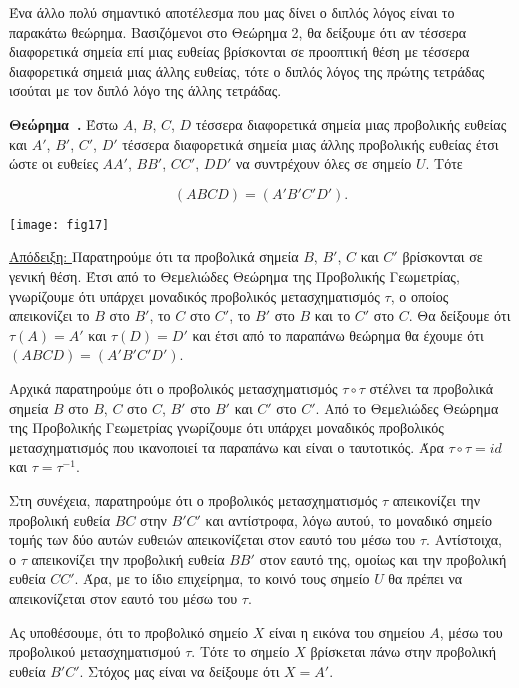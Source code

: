 \documentclass[12pt, a4paper]{book}
\newcounter{theorem}[section]
\newenvironment{theorem}[1][]{\refstepcounter{theorem}\par\medskip
   \textbf{Θεώρημα~\thetheorem. #1} \rmfamily}{\medskip}
\begin{document}
Ένα άλλο πολύ σημαντικό αποτέλεσμα που μας δίνει ο διπλός λόγος είναι το παρακάτω θεώρημα. Βασιζόμενοι στο Θεώρημα 2, θα δείξουμε ότι αν τέσσερα διαφορετικά σημεία επί μιας ευθείας βρίσκονται σε προοπτική θέση με τέσσερα διαφορετικά σημειά μιας άλλης ευθείας, τότε ο διπλός λόγος της πρώτης τετράδας ισούται με τον διπλό λόγο της άλλης τετράδας. 

\begin{theorem}
Έστω $A$, $B$, $C$, $D$ τέσσερα διαφορετικά σημεία μιας προβολικής ευθείας και $A'$, $B'$, $C'$, $D'$ τέσσερα διαφορετικά σημεία μιας άλλης προβολικής ευθείας έτσι ώστε οι ευθείες $AA'$, $BB'$, $CC'$, $DD'$ να συντρέχουν όλες σε σημείο $U$. Τότε

\begin{displaymath}
(ABCD)=(A'B'C'D').
\end{displaymath}
\end{theorem}

\begin{center}
\texttt{[image: fig17]}
\end{center}

\underline{Απόδειξη: } Παρατηρούμε ότι τα προβολικά σημεία $B$, $B'$, $C$ και $C'$ βρίσκονται σε γενική θέση. Έτσι από το Θεμελιώδες Θεώρημα της Προβολικής Γεωμετρίας, γνωρίζουμε ότι υπάρχει μοναδικός προβολικός μετασχηματισμός $τ$, ο οποίος απεικονίζει το $B$ στο $B'$, το $C$ στο $C'$, το $B'$ στο $B$ και το $C'$ στο $C$. Θα δείξουμε ότι $τ(A)=A'$ και $τ(D)=D'$ και έτσι από το παραπάνω θεώρημα θα έχουμε ότι $(ABCD)=(A'B'C'D')$.

Αρχικά παρατηρούμε ότι ο προβολικός μετασχηματισμός $τ \circ τ$ στέλνει τα προβολικά σημεία  $B$ στο $B$, $C$ στο $C$, $B'$ στο $B'$ και $C'$ στο $C'$. Από το Θεμελιώδες Θεώρημα της Προβολικής Γεωμετρίας γνωρίζουμε ότι υπάρχει μοναδικός προβολικός μετασχηματισμός που ικανοποιεί τα παραπάνω και είναι ο ταυτοτικός. Άρα $τ \circ τ = id$ και  $τ = τ ^{-1}$.

Στη συνέχεια, παρατηρούμε ότι ο προβολικός μετασχηματισμός $τ$ απεικονίζει την προβολική ευθεία $BC$ στην $B'C'$ και αντίστροφα, λόγω αυτού, το μοναδικό σημείο τομής των δύο αυτών ευθειών απεικονίζεται στον εαυτό του μέσω του $τ$. Αντίστοιχα, ο $τ$ απεικονίζει την προβολική ευθεία $BB'$ στον εαυτό της, ομοίως και την προβολική ευθεία $CC'$. Άρα, με το ίδιο επιχείρημα, το κοινό τους σημείο $U$ θα πρέπει να απεικονίζεται στον εαυτό του μέσω του $τ$.

Ας υποθέσουμε, ότι το προβολικό σημείο $X$ είναι η εικόνα του σημείου $Α$, μέσω του προβολικού μετασχηματισμού $τ$. Τότε το σημείο $X$ βρίσκεται πάνω στην προβολική ευθεία $B'C'$. Στόχος μας είναι να δείξουμε ότι $X = A'$. 
\end{document}
